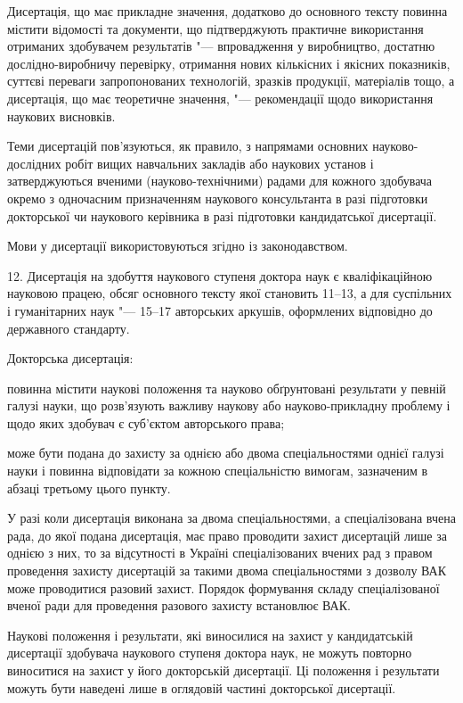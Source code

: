 \documentclass{vakaref}
\theoremstyle{plain}
\theoremstyle{definition}
\theoremstyle{remark}
\begin{document}
Дисертація, що має прикладне значення, додатково до основного
тексту повинна містити відомості та документи, що підтверджують
практичне використання отриманих здобувачем результатів "---
впровадження у виробництво, достатню дослідно-виробничу перевірку,
отримання нових кількісних і якісних показників, суттєві переваги
запропонованих технологій, зразків продукції, матеріалів тощо, а
дисертація, що має теоретичне значення, "--- рекомендації щодо
використання наукових висновків.

Теми дисертацій пов'язуються, як правило, з напрямами основних
науково-дослідних робіт вищих навчальних закладів або наукових
установ і затверджуються вченими (науково-технічними) радами для
кожного здобувача окремо з одночасним призначенням наукового
консультанта в разі підготовки докторської чи наукового керівника
в разі підготовки кандидатської дисертації.

Мови у дисертації використовуються згідно із законодавством.

12. Дисертація на здобуття наукового ступеня доктора наук є
кваліфікаційною науковою працею, обсяг основного тексту якої
становить 11--13, а для суспільних і гуманітарних наук "--- 15--17
авторських аркушів, оформлених відповідно до державного стандарту.

Докторська дисертація:

повинна містити наукові положення та науково обґрунтовані
результати у певній галузі науки, що розв'язують важливу наукову
або науково-прикладну проблему і щодо яких здобувач є суб'єктом
авторського права;

може бути подана до захисту за однією або двома спеціальностями
однієї галузі науки і повинна відповідати за кожною спеціальністю
вимогам, зазначеним в абзаці третьому цього пункту.

У разі коли дисертація виконана за двома спеціальностями, а
спеціалізована вчена рада, до якої подана дисертація, має право
проводити захист дисертацій лише за однією з них, то за
відсутності в Україні спеціалізованих вчених рад з правом
проведення захисту дисертацій за такими двома спеціальностями з
дозволу ВАК може проводитися разовий захист. Порядок формування
складу спеціалізованої вченої ради для проведення разового захисту
встановлює ВАК.

Наукові положення і результати, які виносилися на захист у
кандидатській дисертації здобувача наукового ступеня доктора наук,
не можуть повторно виноситися на захист у його докторській
дисертації. Ці положення і результати можуть бути наведені лише в
оглядовій частині докторської дисертації.
\end{document}
